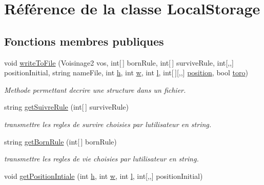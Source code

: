 \hypertarget{class_local_storage}{}\section{Référence de la classe Local\+Storage}
\label{class_local_storage}
\subsection*{Fonctions membres publiques}
\begin{DoxyCompactItemize}
\item 
void \mbox{\hyperlink{class_local_storage_ad926dd8fdacba87487812c2063aee8dc}{write\+To\+File}} (Voisinage2 vos, int\mbox{[}$\,$\mbox{]} born\+Rule, int\mbox{[}$\,$\mbox{]} survive\+Rule, int\mbox{[},,\mbox{]} position\+Initial, string name\+File, int \mbox{\hyperlink{class_local_storage_ab025e3ab66a812167b739de8f636e72f}{h}}, int \mbox{\hyperlink{class_local_storage_abac4c0cb7803f4f4438aba6a02a9eba2}{w}}, int \mbox{\hyperlink{class_local_storage_a37e93f37b061a398e9d3cbfaf4c7fecd}{l}}, int\mbox{[}$\,$\mbox{]}\mbox{[},,\mbox{]} \mbox{\hyperlink{class_local_storage_a135431eb0ae788b698b206b3cf12130d}{position}}, bool \mbox{\hyperlink{class_local_storage_a1feec4c648ee8f58201078f146677b63}{toro}})
\begin{DoxyCompactList}\small\item\em Methode permettant d\textquotesingle{}ecrire une structure dans un fichier. \end{DoxyCompactList}\item 
string \mbox{\hyperlink{class_local_storage_a20e7dd1d1990599a38017e986944fada}{get\+Suivre\+Rule}} (int\mbox{[}$\,$\mbox{]} survive\+Rule)
\begin{DoxyCompactList}\small\item\em transmettre les regles de survire choisies par l\textquotesingle{}utilisateur en string. \end{DoxyCompactList}\item 
string \mbox{\hyperlink{class_local_storage_a64ead0288876a2aa3fbb7d86d3d68cc5}{get\+Born\+Rule}} (int\mbox{[}$\,$\mbox{]} born\+Rule)
\begin{DoxyCompactList}\small\item\em transmettre les regles de vie choisies par l\textquotesingle{}utilisateur en string. \end{DoxyCompactList}\item 
void \mbox{\hyperlink{class_local_storage_a734f343d76b672b65a1dd211dcdca087}{get\+Position\+Intiale}} (int \mbox{\hyperlink{class_local_storage_ab025e3ab66a812167b739de8f636e72f}{h}}, int \mbox{\hyperlink{class_local_storage_abac4c0cb7803f4f4438aba6a02a9eba2}{w}}, int \mbox{\hyperlink{class_local_storage_a37e93f37b061a398e9d3cbfaf4c7fecd}{l}}, int\mbox{[},,\mbox{]} position\+Initial)

\end{DoxyCompactItemize}
